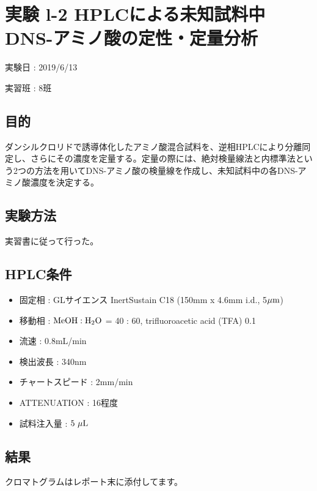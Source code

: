 \documentclass[a4paper,papersize,dvipdfmx]{jsarticle}
\begin{document}
\newpage

\section*{実験 l-2 HPLCによる未知試料中DNS-アミノ酸の定性・定量分析}
\begin{flushright}
実験日 : 2019/6/13

実習班 : 8班
\end{flushright}

\subsection*{目的}
ダンシルクロリドで誘導体化したアミノ酸混合試料を、逆相HPLCにより分離同定し、さらにその濃度を定量する。定量の際には、絶対検量線法と内標準法という2つの方法を用いてDNS-アミノ酸の検量線を作成し、未知試料中の各DNS-アミノ酸濃度を決定する。

\subsection*{実験方法}
実習書に従って行った。

\subsection*{HPLC条件}
\begin{itemize}
\item 固定相 : GLサイエンス InertSustain C18 (150mm x 4.6mm i.d., 5$\rm \mu m$)
\item 移動相 : $\rm MeOH : H_2O$ = 40 : 60, trifluoroacetic acid (TFA) 0.1%
\item 流速 : 0.8mL/min
\item 検出波長 : 340nm
\item チャートスピード : 2mm/min
\item ATTENUATION : 16程度
\item 試料注入量 : $5 \  \rm \mu L$

\end{itemize}
\subsection*{結果}

クロマトグラムはレポート末に添付してます。
\end{document}
